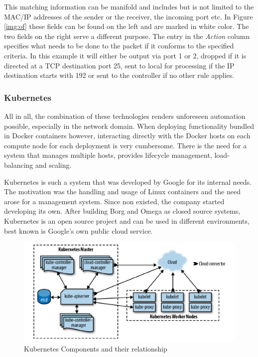 This matching information can be manifold and includes but is not limited to the MAC/IP addresses of the sender or the receiver, the incoming port etc. In Figure \ref{img:of} these fields can be found on the left and are marked in white color. The two fields on the right serve a different purpose. The entry in the \textit{Action} column specifies what needs to be done to the packet if it conforms to the specified criteria. In this example it will either be output via port 1 or 2, dropped if it is directed at a TCP destination port 25, sent to local for processing if the IP destination starts with 192 or sent to the controller if no other rule applies. 

\subsubsection{Kubernetes}
All in all, the combination of these technologies renders unforeseen automation possible, especially in the network domain. When deploying functionality bundled in Docker containers however, interacting directly with the Docker hosts on each compute node for each deployment is very cumbersome. There is the need for a system that manages multiple hosts, provides lifecycle management, load-balancing and scaling. 

Kubernetes is such a system that was developed by Google for its internal needs. The motivation was the handling and usage of Linux containers and the need arose for a management system. Since non existed, the company started developing its own. After building Borg and Omega as closed source systems, Kubernetes is an open source project and can be used in different environments, best known is Google's own public cloud service.

\begin{figure}[h]
	\includegraphics[width=\linewidth]{images/k8Arch.png}
	\caption{Kubernetes Components and their relationship \cite{k8CN}}
	\label{fig:k8}
\end{figure}

